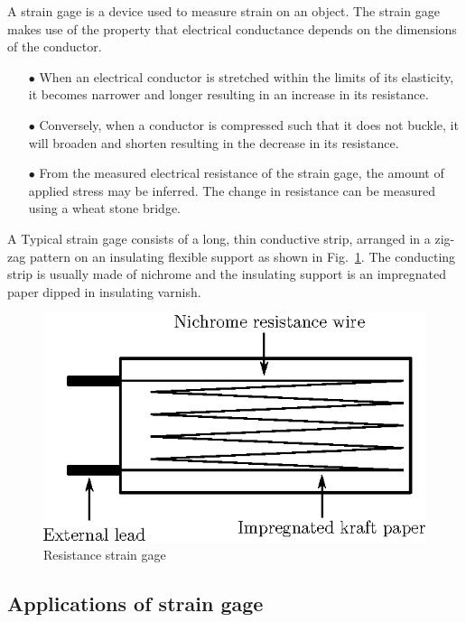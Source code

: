 A strain gage is a device used to measure strain on an object. The strain gage makes use of the property that electrical conductance depends on the dimensions of the conductor.
\begin{itemize}
\itemsep=0pt
\item[$\bullet$] When an electrical conductor is stretched within the limits of its elasticity, it becomes narrower and longer resulting in an increase in its resistance.

\item[$\bullet$] Conversely, when a conductor is compressed such that it does not buckle, it will broaden and shorten resulting in the decrease in its resistance. 

\item[$\bullet$] From the measured electrical resistance of the strain gage, the amount of applied stress may be inferred. The change in resistance can be measured using a wheat stone bridge.
\end{itemize}

A Typical strain gage consists of a long, thin conductive strip, arranged in a zig-zag pattern on an insulating flexible support as shown in Fig.~\ref{fig8.7}. The conducting strip is usually made of nichrome and the insulating support is an impregnated paper dipped in insulating varnish. 
\begin{figure}[H]
\centering
\includegraphics[scale=.9]{chap8/fig8.7.eps}
\smallskip
\caption{Resistance strain gage}\label{fig8.7}
\end{figure}

\subsection{Applications of strain gage}\label{sec8.6.1}

